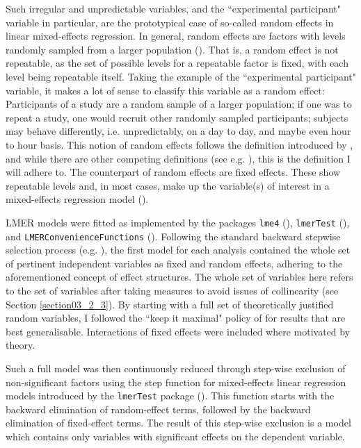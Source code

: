 Such irregular and unpredictable variables, and the ``experimental participant" variable in particular, are the prototypical case of so-called random effects in linear mixed-effects regression. In general, random effects are factors with levels randomly sampled from a larger population (\cite{Baayen2008}). That is, a random effect is not repeatable, as the set of possible levels for a repeatable factor is fixed, with each level being repeatable itself. Taking the example of the ``experimental participant" variable, it makes a lot of sense to classify this variable as a random effect: Participants of a study are a random sample of a larger population; if one was to repeat a study, one would recruit other randomly sampled participants; subjects may behave differently, i.e. unpredictably, on a day to day, and maybe even hour to hour basis. This notion of random effects follows the definition introduced by \citet{Green1960}, and while there are other competing definitions (see e.g. \cite{Kreft1998, Searle2009, Snijders2011, McElreath2015}), this is the definition I will adhere to. The counterpart of random effects are fixed effects. These show repeatable levels and, in most cases, make up the variable(s) of interest in a mixed-effects regression model (\cite{Baayen2008}).

LMER models were fitted as implemented by the packages \texttt{lme4} (\cite{Bates2015}), \texttt{lmerTest} (\cite{Kuznetsova2017}), and \texttt{LMERConvenienceFunctions} (\cite{Tremblay2020}). Following the standard backward stepwise selection process (e.g. \cite{Baayen2008}), the first model for each analysis contained the whole set of pertinent independent variables as fixed and random effects, adhering to the aforementioned concept of effect structures. The whole set of variables here refers to the set of variables after taking measures to avoid issues of collinearity (see Section \ref{section03_2_3}). By starting with a full set of theoretically justified random variables, I followed the ``keep it maximal" policy of \citet{Barr2013} for results that are best generalisable. Interactions of fixed effects were included where motivated by theory.

Such a full model was then continuously reduced through step-wise exclusion of non-significant factors using the step function for mixed-effects linear regression models introduced by the \texttt{lmerTest} package (\cite{Kuznetsova2017}). This function starts with the backward elimination of random-effect terms, followed by the backward elimination of fixed-effect terms. The result of this step-wise exclusion is a model which contains only variables with significant effects on the dependent variable.

